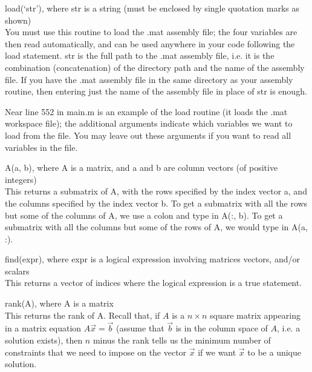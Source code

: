\documentclass[oneside, english, reqno]{amsart}
\theoremstyle{plain}
\theoremstyle{plain}
\theoremstyle{plain}
\theoremstyle{plain}
\theoremstyle{definition}
\theoremstyle{definition}
\theoremstyle{definition}
\numberwithin{equation}{section}
\begin{document}
\noindent load(`str'), where str is a string (must be enclosed by single quotation marks as shown) \\[6pt]
\mbox{\hspace{0.5cm}} You must use this routine to load the .mat assembly file; the four variables are then read automatically, and can be used anywhere in your code following the load statement. str is the full path to the .mat assembly file, i.e. it is the combination (concatenation) of the directory path and the name of the assembly file. If you have the .mat assembly file in the same directory as your assembly routine, then entering just the name of the assembly file in place of str is enough.

Near line 552 in main.m is an example of the load routine (it loads the .mat workspace file); the additional arguments indicate which variables we want to load from the file. You may leave out these arguments if you want to read all variables in the file. \vspace{15pt}

\noindent A(a, b), where A is a matrix, and a and b are column vectors (of positive integers) \\[6pt]
\mbox{\hspace{0.5cm}} This returns a submatrix of A, with the rows specified by the index vector a, and the columns specified by the index vector b. To get a submatrix with all the rows but some of the columns of A, we use a colon and type in A(:, b). To get a submatrix with all the columns but some of the rows of A, we would type in A(a, :). \vspace{15pt}

\noindent find(expr), where expr is a logical expression involving matrices vectors, and/or scalars \\[6pt]
\mbox{\hspace{0.5cm}} This returns a vector of indices where the logical expression is a true statement. \vspace{15pt}

\noindent rank(A), where A is a matrix \\[6pt]
\mbox{\hspace{0.5cm}} This returns the rank of A. Recall that, if \(A\) is a \(n \times n\) square matrix appearing in a matrix equation \(A\vec{x} = \vec{b}\) (assume that \(\vec{b}\) is in the column space of \(A\), i.e. a solution exists), then \(n\) minus the rank tells us the minimum number of constraints that we need to impose on the vector \(\vec{x}\) if we want \(\vec{x}\) to be a unique solution. \vspace{15pt}
\end{document}
